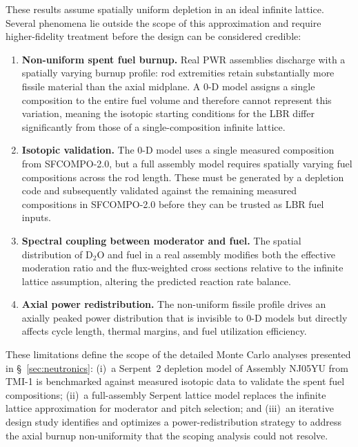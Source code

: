 These results assume spatially uniform depletion in an ideal infinite lattice. Several phenomena lie outside the scope of this approximation and require higher-fidelity treatment before the design can be considered credible:

\begin{enumerate}
    \item \textbf{Non-uniform spent fuel burnup.} Real PWR assemblies discharge with a spatially varying burnup profile: rod extremities retain substantially more fissile material than the axial midplane. A 0-D model assigns a single composition to the entire fuel volume and therefore cannot represent this variation, meaning the isotopic starting conditions for the LBR differ significantly from those of a single-composition infinite lattice.
    \item \textbf{Isotopic validation.} The 0-D model uses a single measured composition from SFCOMPO-2.0, but a full assembly model requires spatially varying fuel compositions across the rod length. These must be generated by a depletion code and subsequently validated against the remaining measured compositions in SFCOMPO-2.0 before they can be trusted as LBR fuel inputs.
    \item \textbf{Spectral coupling between moderator and fuel.} The spatial distribution of D$_2$O and fuel in a real assembly modifies both the effective moderation ratio and the flux-weighted cross sections relative to the infinite lattice assumption, altering the predicted reaction rate balance.
    \item \textbf{Axial power redistribution.} The non-uniform fissile profile drives an axially peaked power distribution that is invisible to 0-D models but directly affects cycle length, thermal margins, and fuel utilization efficiency.
\end{enumerate}

These limitations define the scope of the detailed Monte Carlo analyses presented in \S~\ref{sec:neutronics}: (i)~a Serpent~2 depletion model of Assembly NJ05YU from TMI-1 is benchmarked against measured isotopic data to validate the spent fuel compositions; (ii)~a full-assembly Serpent lattice model replaces the infinite lattice approximation for moderator and pitch selection; and (iii)~an iterative design study identifies and optimizes a power-redistribution strategy to address the axial burnup non-uniformity that the scoping analysis could not resolve.